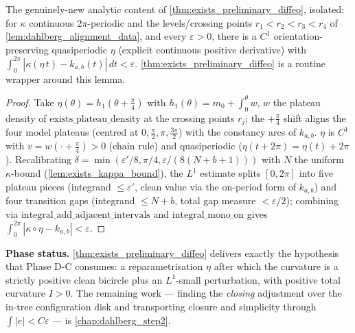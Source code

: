 \begin{lemma}


  \label{lem:exists_eta_clean_L1}
  The genuinely-new analytic content of \cref{thm:exists_preliminary_diffeo},
  isolated: for $\kappa$ continuous $2\pi$-periodic and the levels/crossing points
  $r_1<r_2<r_3<r_4$ of \cref{lem:dahlberg_alignment_data}, and every
  $\varepsilon>0$, there is a $C^1$ orientation-preserving quasiperiodic $\eta$
  (explicit continuous positive derivative) with
  $\int_0^{2\pi}|\kappa(\eta\,t)-k_{a,b}(t)|\,dt<\varepsilon$.
  \cref{thm:exists_preliminary_diffeo} is a routine wrapper around this lemma.
\end{lemma}
\begin{proof}
  \leanok
  Take $\eta(\theta)=h_1(\theta+\tfrac{\pi}{4})$ with $h_1(\theta)=m_0+\int_0^\theta w$,
  $w$ the plateau density of $\mathrm{exists\_plateau\_density}$ at the crossing
  points $r_j$; the $+\tfrac{\pi}{4}$ shift aligns the four model plateaus (centred
  at $0,\tfrac{\pi}{2},\pi,\tfrac{3\pi}{2}$) with the constancy arcs of $k_{a,b}$.
  $\eta$ is $C^1$ with $v=w(\cdot+\tfrac{\pi}{4})>0$ (chain rule) and quasiperiodic
  ($\eta(t+2\pi)=\eta(t)+2\pi$). Recalibrating
  $\delta=\min(\varepsilon'/8,\pi/4,\varepsilon/(8(N{+}b{+}1)))$ with $N$ the uniform
  $\kappa$-bound (\cref{lem:exists_kappa_bound}), the $L^1$ estimate splits $[0,2\pi]$
  into five plateau pieces (integrand $\le\varepsilon'$, clean value via the on-period
  form of $k_{a,b}$) and four transition gaps (integrand $\le N+b$, total gap measure
  $<\varepsilon/2$); combining via $\mathrm{integral\_add\_adjacent\_intervals}$ and
  $\mathrm{integral\_mono\_on}$ gives $\int_0^{2\pi}|\kappa\circ\eta-k_{a,b}|<\varepsilon$.
\end{proof}

\noindent\textbf{Phase status.} \cref{thm:exists_preliminary_diffeo} delivers
exactly the hypothesis that Phase D-C consumes: a reparametrisation $\eta$ after
which the curvature is a strictly positive clean bicircle plus an $L^1$-small
perturbation, with positive total curvature $I>0$. The remaining work --- finding
the \emph{closing} adjustment over the in-tree configuration disk and transporting
closure and simplicity through $\int|e|<C\varepsilon$ --- is
\cref{chap:dahlberg_step2}.
